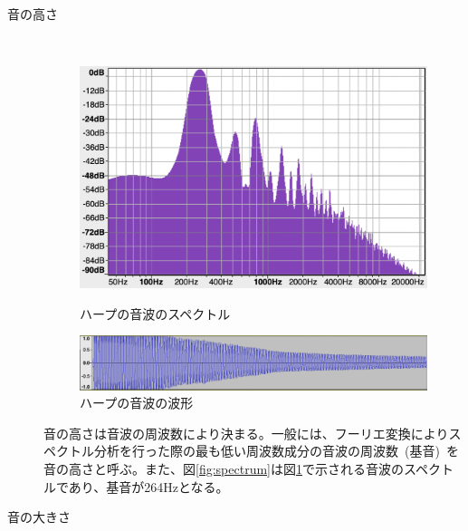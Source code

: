 \begin{description}

\item[音の高さ]\mbox{}\\

\begin{figure}[H]
\begin{center}
\begin{minipage}{0.45\hsize}
\begin{center}
\includegraphics[width=0.9\hsize]{figure/c4_harp_spectrum.png}
\caption{ハープの音波のスペクトル}
\label{fig:spectrum}
\end{center}
\end{minipage}
\begin{minipage}{0.45\hsize}
\begin{center}
\includegraphics[width=0.9\hsize]{figure/c4_harp_wav.png}
\caption{ハープの音波の波形}
\label{fig:wav}
\end{center}
\end{minipage}
\end{center}
\end{figure}

音の高さは音波の周波数により決まる。一般には、フーリエ変換によりスペクトル分析を行った際の最も低い周波数成分の音波の周波数~(基音)~を音の高さと呼ぶ。また、図\ref{fig:spectrum}は図\ref{fig:wav}で示される音波のスペクトルであり、基音が264Hzとなる。

\item[音の大きさ]\mbox{}\\


\end{description}
